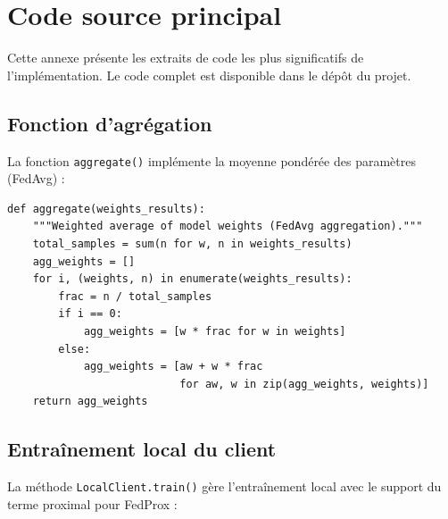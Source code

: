 \documentclass[12pt,a4paper]{report}
\begin{document}
\chapter{Code source principal}

Cette annexe pr\'{e}sente les extraits de code les plus significatifs de l'impl\'{e}mentation. Le code complet est disponible dans le d\'{e}p\^{o}t du projet.

\section{Fonction d'agr\'{e}gation}

La fonction \texttt{aggregate()} impl\'{e}mente la moyenne pond\'{e}r\'{e}e des param\`{e}tres (FedAvg) :

\begin{lstlisting}[caption={Fonction d'agr\'{e}gation FedAvg.},label={lst:aggregate}]
def aggregate(weights_results):
    """Weighted average of model weights (FedAvg aggregation)."""
    total_samples = sum(n for w, n in weights_results)
    agg_weights = []
    for i, (weights, n) in enumerate(weights_results):
        frac = n / total_samples
        if i == 0:
            agg_weights = [w * frac for w in weights]
        else:
            agg_weights = [aw + w * frac
                           for aw, w in zip(agg_weights, weights)]
    return agg_weights
\end{lstlisting}

\section{Entra\^{i}nement local du client}

La m\'{e}thode \texttt{LocalClient.train()} g\`{e}re l'entra\^{i}nement local avec le support du terme proximal pour FedProx :
\end{document}
